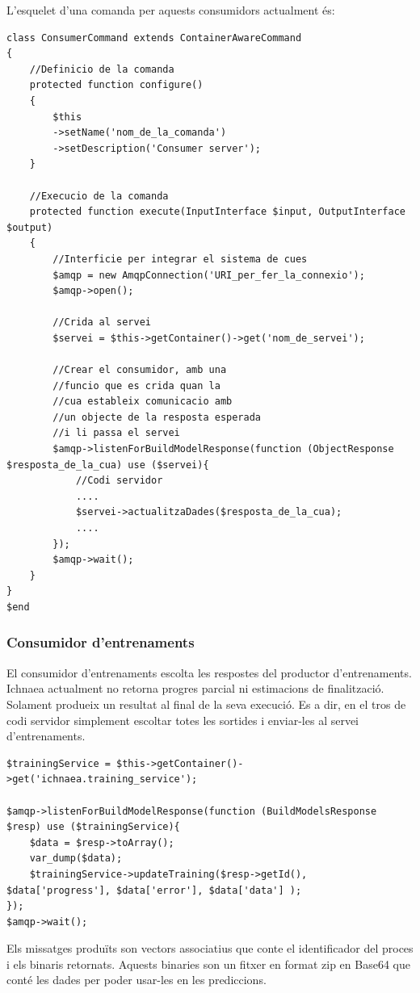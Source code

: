 L'esquelet d'una comanda per aquests consumidors actualment \'{e}s:
\begin{lstlisting}
class ConsumerCommand extends ContainerAwareCommand
{
	//Definicio de la comanda
	protected function configure()
	{
		$this
		->setName('nom_de_la_comanda')
		->setDescription('Consumer server');
	}
	
	//Execucio de la comanda
	protected function execute(InputInterface $input, OutputInterface $output)
	{
		//Interficie per integrar el sistema de cues
		$amqp = new AmqpConnection('URI_per_fer_la_connexio');
		$amqp->open();
		
		//Crida al servei
		$servei = $this->getContainer()->get('nom_de_servei');
		
		//Crear el consumidor, amb una 
		//funcio que es crida quan la 
		//cua estableix comunicacio amb 
		//un objecte de la resposta esperada 
		//i li passa el servei 
		$amqp->listenForBuildModelResponse(function (ObjectResponse $resposta_de_la_cua) use ($servei){
		 	//Codi servidor
		 	....
			$servei->actualitzaDades($resposta_de_la_cua);
			....
		});
		$amqp->wait();
	}
}
$end
\end{lstlisting}

\subsubsection{Consumidor d'entrenaments}
El consumidor d'entrenaments escolta les respostes del productor d'entrenaments. \\

Ichnaea actualment no retorna progres parcial ni estimacions de finalitzaci\'{o}. Solament produeix un resultat al final de la seva execució. Es a dir, en el tros de codi servidor simplement escoltar totes les sortides i enviar-les al servei d'entrenaments.

\begin{lstlisting}
$trainingService = $this->getContainer()->get('ichnaea.training_service');
		
$amqp->listenForBuildModelResponse(function (BuildModelsResponse $resp) use ($trainingService){
	$data = $resp->toArray();
	var_dump($data);
	$trainingService->updateTraining($resp->getId(), $data['progress'], $data['error'], $data['data'] );
});
$amqp->wait();
\end{lstlisting}

Els missatges produïts son vectors associatius que conte el identificador del proces i els binaris retornats. Aquests binaries son un fitxer en format zip en Base64 que cont\'{e} les dades per poder usar-les en les prediccions.

